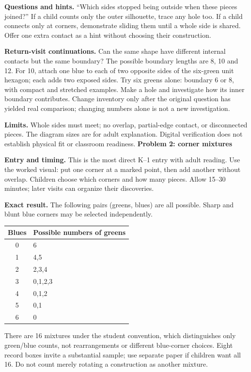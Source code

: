 \documentclass[11pt]{article}
\newcommand\lead[1]{\textbf{#1}\par}
\begin{document}
\textbf{Questions and hints.} ``Which sides stopped being outside when these pieces joined?'' If a child counts only the outer silhouette, trace any hole too. If a child connects only at corners, demonstrate sliding them until a whole side is shared. Offer one extra contact as a hint without choosing their construction.

\textbf{Return-visit continuations.} Can the same shape have different internal contacts but the same boundary? The possible boundary lengths are 8, 10 and 12. For 10, attach one blue to each of two opposite sides of the six-green unit hexagon; each adds two exposed sides. Try six greens alone: boundary 6 or 8, with compact and stretched examples. Make a hole and investigate how its inner boundary contributes. Change inventory only after the original question has yielded real comparison; changing numbers alone is not a new investigation.

\textbf{Limits.} Whole sides must meet; no overlap, partial-edge contact, or disconnected pieces. The diagram sizes are for adult explanation. Digital verification does not establish physical fit or classroom readiness.
\newpage
\lead{Problem 2: corner mixtures}
\textbf{Entry and timing.} This is the most direct K--1 entry with adult reading. Use the worked visual: put one corner at a marked point, then add another without overlap. Children choose which corners and how many pieces. Allow 15--30 minutes; later visits can organize their discoveries.

\textbf{Exact result.} The following pairs (greens, blues) are all possible. Sharp and blunt blue corners may be selected independently.

\begin{center}\begin{tabular}{c|l}
Blues & Possible numbers of greens\\\hline
0 & 6\\
1 & 4,5\\
2 & 2,3,4\\
3 & 0,1,2,3\\
4 & 0,1,2\\
5 & 0,1\\
6 & 0
\end{tabular}\end{center}

There are 16 mixtures under the student convention, which distinguishes only green/blue counts, not rearrangements or different blue-corner choices. Eight record boxes invite a substantial sample; use separate paper if children want all 16. Do not count merely rotating a construction as another mixture.
\end{document}
